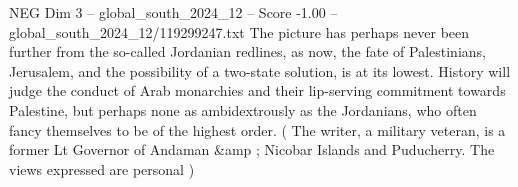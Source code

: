 \begin{textsample}{NEG Dim 3 – global\_south\_2024\_12 – Score -1.00 – global\_south\_2024\_12/119299247.txt}
The picture has perhaps never been further from the so-called Jordanian redlines, as now, the fate of Palestinians, Jerusalem, and the possibility of a two-state solution, is at its lowest.
History will judge the conduct of Arab monarchies and their lip-serving commitment towards Palestine, but perhaps none as ambidextrously as the Jordanians, who often fancy themselves to be of the highest order. ( The writer, a military veteran, is a former Lt Governor of Andaman \&amp ; Nicobar Islands and Puducherry.
The views expressed are personal )

\end{textsample}
